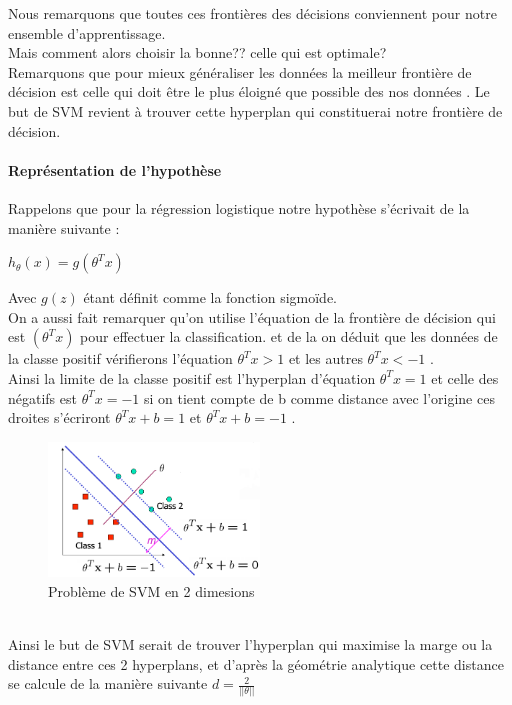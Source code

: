 Nous remarquons que toutes ces frontières des décisions conviennent pour notre ensemble d'apprentissage.\\ Mais comment alors choisir la bonne?? celle qui est optimale?\\
Remarquons que pour mieux généraliser les données la meilleur  frontière de décision est celle qui doit être le plus éloigné que possible des nos données .  
Le but de SVM revient à trouver cette hyperplan qui constituerai notre frontière de décision.
\paragraph{Représentation de l'hypothèse }
Rappelons que pour la régression logistique notre hypothèse s'écrivait de la manière suivante :
\begin{center}
	${h}_{\theta}\left(x\right)=g({\theta }^{T}{x})$
\end{center} Avec $g(z)$ étant définit comme la fonction sigmoïde.\\
On a aussi fait remarquer qu'on utilise l'équation de la frontière  de décision qui est $({\theta }^{T}{x})$ pour effectuer la classification.
et de la on déduit que les données de la classe positif vérifierons l'équation ${\theta }^{T}{x} > 1$ et les autres ${\theta }^{T}{x} <-1$ .\\
Ainsi la limite de la classe positif est l'hyperplan d'équation  ${\theta }^{T}{x} = 1$  et celle des négatifs est ${\theta }^{T}{x} =-1$ si on tient compte de b comme distance avec l'origine ces droites s'écriront 
${\theta }^{T}{x} + b = 1$  et ${\theta }^{T}{x} + b=- 1$ .
 \begin{figure}[ht]
 	\centering
 	\includegraphics[width=0.5\textwidth]{fig/SVN2D.png}
 	\caption{Problème de SVM en 2 dimesions  }
 	\label{fig:image14}
 \end{figure}\\
Ainsi le but de SVM serait de trouver l'hyperplan qui maximise la marge ou la distance  entre ces 2  hyperplans, et d'après la géométrie analytique cette distance se calcule de la manière suivante $d =\frac{2}{||\theta||}$
